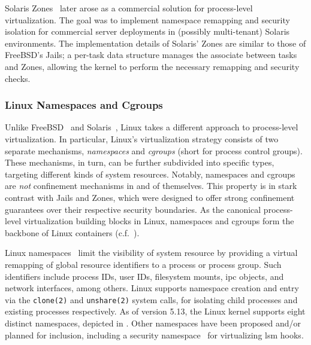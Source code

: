 \documentclass[
  fontsize=12pt,
  titlepage=firstiscover,
  paper=letter,
oneside,
  cleardoublepage=plain,
  parskip=half-,
  DIV=10,
  parindent,
  appendixprefix,
  chapterprefix,
  listof=totoc,
]{scrbook}
\begin{document}
Solaris Zones~\cite{price2004_zones} later arose as a commercial solution for
process-level virtualization. The goal was to implement namespace remapping and security
isolation for commercial server deployments in (possibly multi-tenant) Solaris
environments. The implementation details of Solaris' Zones are similar to those of
FreeBSD's Jails; a per-task data structure manages the associate between tasks and Zones,
allowing the kernel to perform the necessary remapping and security checks.

\subsubsection*{Linux Namespaces and Cgroups}

Unlike FreeBSD~\cite{kamp2000_jails} and Solaris~\cite{price2004_zones}, Linux takes
a different approach to process-level virtualization. In particular, Linux's
virtualization strategy consists of two separate mechanisms, \textit{namespaces} and
\textit{cgroups} (short for process control groups). These mechanisms, in turn, can be
further subdivided into specific types, targeting different kinds of system resources.
Notably, namespaces and cgroups are \textit{not} confinement mechanisms in and of
themselves. This property is in stark contrast with Jails and Zones, which were designed
to offer strong confinement guarantees over their respective security boundaries.
As the canonical process-level virtualization building blocks in Linux, namespaces and
cgroups form the backbone of Linux containers (c.f.\ ).

Linux namespaces~\cite{biederman2006_namespaces, linux_namespaces} limit the visibility of
system resource by providing a virtual remapping of global resource identifiers to
a process or process group. Such identifiers include process IDs, user IDs, filesystem
mounts, \gls{ipc} objects, and network interfaces, among others. Linux supports namespace
creation and entry via the \texttt{clone(2)} and \texttt{unshare(2)} system calls, for
isolating child processes and existing processes respectively. As of version 5.13, the
Linux kernel supports eight distinct namespaces, depicted in . Other
namespaces have been proposed and/or planned for inclusion, including a security
namespace~\cite{sun2018_security_namespace} for virtualizing \gls{lsm} hooks.
\end{document}
